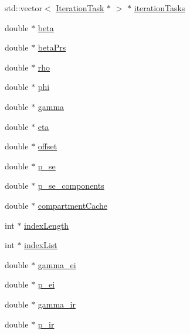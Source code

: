 \begin{DoxyCompactItemize}
\item 
std\-::vector$<$ \hyperlink{classSpatialSEIR_1_1IterationTask}{Iteration\-Task} $\ast$ $>$ $\ast$ \hyperlink{classSpatialSEIR_1_1ModelContext_a681f80cc35dd7a8bf8784710a9175d47}{iteration\-Tasks}
\item 
double $\ast$ \hyperlink{classSpatialSEIR_1_1ModelContext_a7e15e37b3aa868f1b56d0cf92a9839c8}{beta}
\item 
double $\ast$ \hyperlink{classSpatialSEIR_1_1ModelContext_abe52e0e1b4ad61cc0a71c104428c7dfc}{beta\-Prs}
\item 
double $\ast$ \hyperlink{classSpatialSEIR_1_1ModelContext_a633cc9f969abeeb3ad9d3147023af13f}{rho}
\item 
double $\ast$ \hyperlink{classSpatialSEIR_1_1ModelContext_a7873aaa6fe424c33d09287e63cdb6787}{phi}
\item 
double $\ast$ \hyperlink{classSpatialSEIR_1_1ModelContext_a4e545262577a97dd3aceeefc2a956626}{gamma}
\item 
double $\ast$ \hyperlink{classSpatialSEIR_1_1ModelContext_aeecc346cd62bc2c8a816b1451b5da64b}{eta}
\item 
double $\ast$ \hyperlink{classSpatialSEIR_1_1ModelContext_aedc2450556dd5cd0b30a0a1100843f81}{offset}
\item 
double $\ast$ \hyperlink{classSpatialSEIR_1_1ModelContext_a3039a6c9014a3465b38f5becbe369a4a}{p\-\_\-se}
\item 
double $\ast$ \hyperlink{classSpatialSEIR_1_1ModelContext_aa6a04d39cec1ace0e7c57c3551d12bc4}{p\-\_\-se\-\_\-components}
\item 
double $\ast$ \hyperlink{classSpatialSEIR_1_1ModelContext_a7146f9527fc298a50828757e477a33d3}{compartment\-Cache}
\item 
int $\ast$ \hyperlink{classSpatialSEIR_1_1ModelContext_a451632183a787d4aab8bc53c745bea40}{index\-Length}
\item 
int $\ast$ \hyperlink{classSpatialSEIR_1_1ModelContext_a9813501d8b6ac165b9676947f7835473}{index\-List}
\item 
double $\ast$ \hyperlink{classSpatialSEIR_1_1ModelContext_a72509958c44ad6153feff07ec3da9895}{gamma\-\_\-ei}
\item 
double $\ast$ \hyperlink{classSpatialSEIR_1_1ModelContext_ae0827d89df6c5eeca75216149e70b74c}{p\-\_\-ei}
\item 
double $\ast$ \hyperlink{classSpatialSEIR_1_1ModelContext_a9cbe4ffa8f5b19740f7cffc37d1a7b3c}{gamma\-\_\-ir}
\item 
double $\ast$ \hyperlink{classSpatialSEIR_1_1ModelContext_ad313e395d6c4bc5ca5cbda8c189a67da}{p\-\_\-ir}

\end{DoxyCompactItemize}
